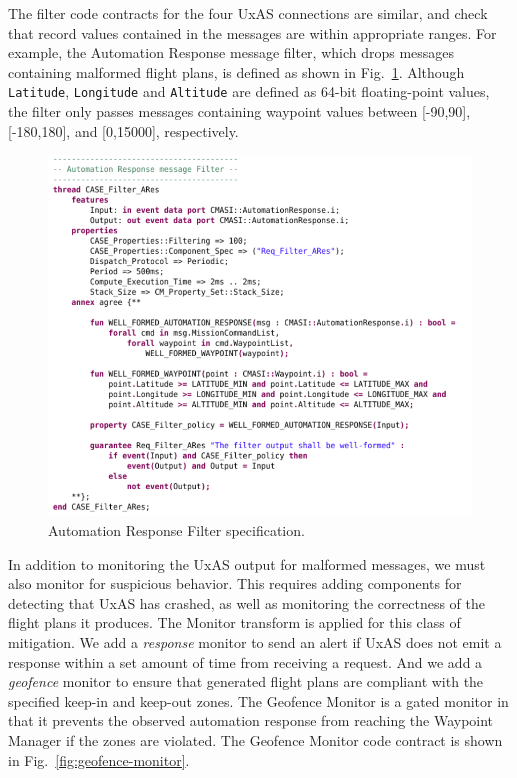 \documentclass[global,twocolumn]{svjour}
\newcommand{\figref}[1]{Fig.~\ref{#1}}
\begin{document}
The filter code contracts for the four UxAS connections are similar, and check that record values contained in the messages are within appropriate ranges.
%
For example, the Automation Response message filter, which drops messages containing malformed flight plans, is defined as shown in \figref{fig:automation-response-filter}.
%
Although \texttt{Latitude}, \texttt{Longitude} and \texttt{Altitude} are defined as 64-bit floating-point values, the filter only passes messages containing waypoint values between [-90,90], [-180,180], and [0,15000], respectively.

\begin{figure}[h]
	\centering
	\includegraphics[width=1\columnwidth]{figs/automation-response-filter.png}
	\caption{Automation Response Filter specification.}
	\label{fig:automation-response-filter}
\end{figure}

In addition to monitoring the UxAS output for malformed messages, we must also monitor for suspicious behavior.
%
This requires adding components for detecting that UxAS has crashed, as well as monitoring the correctness of the flight plans it produces.
%
The Monitor transform is applied for this class of mitigation.
%
We add a \textit{response} monitor to send an alert if UxAS does not emit a response within a set amount of time from receiving a request.
%
And we add a \textit{geofence} monitor to ensure that generated flight plans are compliant with the specified keep-in and keep-out zones.
%
The Geofence Monitor is a gated monitor in that it prevents the observed automation response from reaching the Waypoint Manager if the zones are violated.
%
The Geofence Monitor code contract is shown in \figref{fig:geofence-monitor}.
\end{document}
